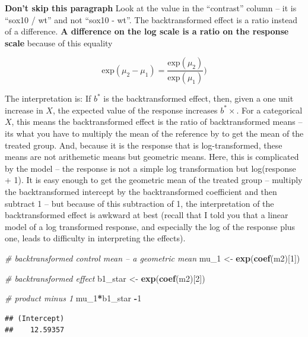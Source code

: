 \documentclass[]{book}
\newenvironment{Shaded}{\begin{snugshade}}{\end{snugshade}}
\newcommand{\KeywordTok}[1]{\textcolor[rgb]{0.13,0.29,0.53}{\textbf{#1}}}
\newcommand{\DecValTok}[1]{\textcolor[rgb]{0.00,0.00,0.81}{#1}}
\newcommand{\StringTok}[1]{\textcolor[rgb]{0.31,0.60,0.02}{#1}}
\newcommand{\CommentTok}[1]{\textcolor[rgb]{0.56,0.35,0.01}{\textit{#1}}}
\newcommand{\OperatorTok}[1]{\textcolor[rgb]{0.81,0.36,0.00}{\textbf{#1}}}
\newcommand{\NormalTok}[1]{#1}
\begin{document}
\textbf{Don't skip this paragraph} Look at the value in the ``contrast''
column -- it is ``sox10 / wt'' and not ``sox10 - wt''. The
backtransformed effect is a ratio instead of a difference. \textbf{A
difference on the log scale is a ratio on the response scale} because of
this equality

\begin{equation}
\mathrm{exp}(\mu_2-\mu_1) = \frac{\mathrm{exp}(\mu_2)}{\mathrm{exp}(\mu_1)})
\end{equation}

The interpretation is: If \(b^*\) is the backtransformed effect, then,
given a one unit increase in \(X\), the expected value of the response
increases \(b^*\times\). For a categorical \(X\), this means the
backtransformed effect is the ratio of backtransformed means -- its what
you have to multiply the mean of the reference by to get the mean of the
treated group. And, because it is the response that is log-transformed,
these means are not arithemetic means but geometric means. Here, this is
complicated by the model -- the response is not a simple log
transformation but log(response + 1). It is easy enough to get the
geometric mean of the treated group -- multiply the backtransformed
intercept by the backtransformed coefficient and then subtract 1 -- but
because of this subtraction of 1, the interpretation of the
backtransformed effect is awkward at best (recall that I told you that a
linear model of a log transformed response, and especially the log of
the response plus one, leads to difficulty in interpreting the effects).

\begin{Shaded}
\begin{Highlighting}[]
\CommentTok{# backtransformed control mean -- a geometric mean}
\NormalTok{mu_}\DecValTok{1}\NormalTok{ <-}\StringTok{ }\KeywordTok{exp}\NormalTok{(}\KeywordTok{coef}\NormalTok{(m2)[}\DecValTok{1}\NormalTok{])}

\CommentTok{# backtransformed effect}
\NormalTok{b1_star <-}\StringTok{ }\KeywordTok{exp}\NormalTok{(}\KeywordTok{coef}\NormalTok{(m2)[}\DecValTok{2}\NormalTok{])}

\CommentTok{# product minus 1}
\NormalTok{mu_}\DecValTok{1}\OperatorTok{*}\NormalTok{b1_star }\OperatorTok{-}\DecValTok{1}
\end{Highlighting}
\end{Shaded}

\begin{verbatim}
## (Intercept) 
##    12.59357
\end{verbatim}
\end{document}
